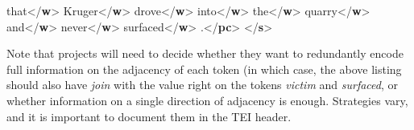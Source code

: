 \begin{shaded}
that{</\textbf{w}>}\mbox{}\newline 
{}Kruger{</\textbf{w}>}\mbox{}\newline 
{}drove{</\textbf{w}>}\mbox{}\newline 
{}into{</\textbf{w}>}\mbox{}\newline 
{}the{</\textbf{w}>}\mbox{}\newline 
{}quarry{</\textbf{w}>}\mbox{}\newline 
{}and{</\textbf{w}>}\mbox{}\newline 
{}never{</\textbf{w}>}\mbox{}\newline 
{}surfaced{</\textbf{w}>}\mbox{}\newline 
{}.{</\textbf{pc}>}\mbox{}\newline 
{</\textbf{s}>}\end{shaded}\egroup\par \par
Note that projects will need to decide whether they want to redundantly encode full information on the adjacency of each token (in which case, the above listing should also have {\itshape join} with the value right on the tokens \textit{victim} and \textit{surfaced}, or whether information on a single direction of adjacency is enough. Strategies vary, and it is important to document them in the TEI header.\par
